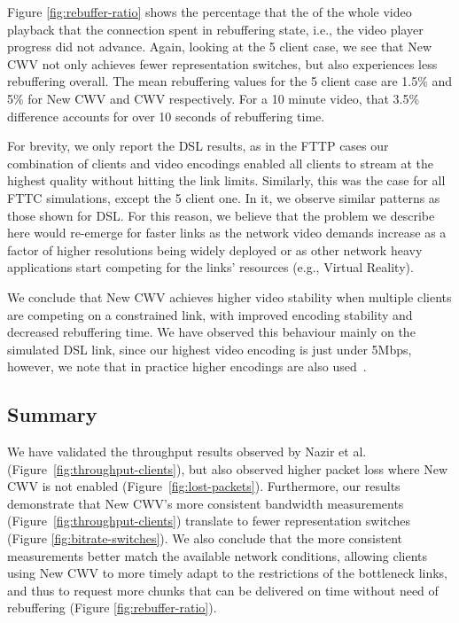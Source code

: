 \documentclass[10pt,sigconf,anonymous]{acmart}
\begin{document}
Figure \ref{fig:rebuffer-ratio} shows the percentage that the of the whole video playback that the connection spent in rebuffering state, i.e., the video player progress did not advance. Again, looking at the 5 client case, we see that New CWV not only achieves fewer representation switches, but also experiences less rebuffering overall. The mean rebuffering values for the 5 client case are 1.5\% and 5\% for New CWV and CWV respectively. For a 10 minute video, that 3.5\% difference accounts for over 10 seconds of rebuffering time.


For brevity, we only report the DSL results, as in the FTTP cases our combination of clients and video encodings enabled all clients to stream at the highest quality without hitting the link limits. Similarly, this was the case for all FTTC simulations, except the 5 client one. In it, we observe similar patterns as those shown for DSL. For this reason, we believe that the problem we describe here would re-emerge for faster links as the network video demands increase as a factor of higher resolutions being widely deployed or as other network heavy applications start competing for the links' resources (e.g., Virtual Reality).

We conclude that New CWV achieves higher video stability when multiple clients are competing on a constrained link, with improved encoding stability and decreased rebuffering time. We have observed this behaviour mainly on the simulated DSL link, since our highest video encoding is just under 5Mbps, however, we note that in practice higher encodings are also used~\cite{online-youtube-encodings}.


\subsection{Summary}
\label{sec:summary}

We have validated the throughput results observed by Nazir et al.~\cite{Nazir-2014-performance-evaluation-congestion-window-validation-dash-newcwv} (Figure~\ref{fig:throughput-clients}), but also observed higher packet loss where New CWV is not enabled (Figure~\ref{fig:lost-packets}). Furthermore, our results demonstrate that New CWV's more consistent bandwidth measurements (Figure~\ref{fig:throughput-clients}) translate to fewer representation switches (Figure \ref{fig:bitrate-switches}). We also conclude that the more consistent measurements better match the available network conditions, allowing clients using New CWV to more timely adapt to the restrictions of the bottleneck links, and thus to request more chunks that can be delivered on time without need of rebuffering (Figure \ref{fig:rebuffer-ratio}).
\end{document}
